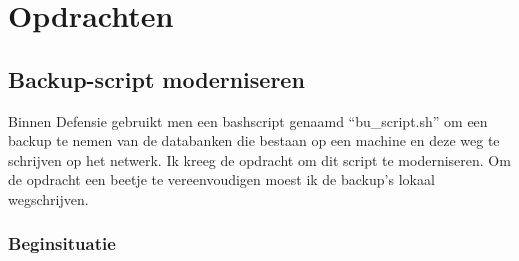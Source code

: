 

\section{Opdrachten}
\label{sec:opdrachten}

\subsection{Backup-script moderniseren}

Binnen Defensie gebruikt men een bashscript genaamd ``bu\_script.sh'' om een backup te nemen van de databanken die bestaan op een machine en deze weg te schrijven op het netwerk.  
Ik kreeg de opdracht om dit script te moderniseren. Om de opdracht een beetje te vereenvoudigen moest ik de backup's lokaal wegschrijven.

\subsubsection{Beginsituatie}

